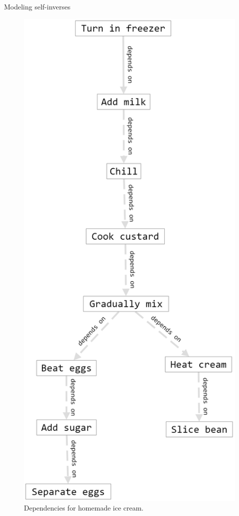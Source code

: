 \begin{challenge}{Modeling self-inverses}
\begin{figure}
\centering
\includegraphics[width=5in]{SWWOv3/media/ch9/figure9-6.png}
\caption{Dependencies for homemade ice cream.}
\label{fig:ch9.6}
\end{figure}



\end{challenge}
